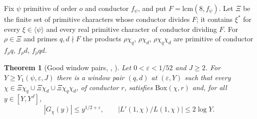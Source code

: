 \documentclass[11pt]{amsart}
\newcommand{\eps}{\varepsilon}
\theoremstyle{plain}
\newtheorem{theorem}{Theorem}[section]
\theoremstyle{definition}
\numberwithin{equation}{section}
\begin{document}
Fix $\psi$ primitive of order $o$ and conductor $f_\psi$, and put $F=\mathrm{lcm}(8,f_\psi)$. Let
$\Xi$ be the finite set of primitive characters whose conductor divides $F$; it contains
$\xi^\ast$ for every $\xi\in\langle\psi\rangle$ and every real primitive character of conductor
dividing $F$. For $\rho\in\Xi$ and primes $q,d\nmid F$ the products $\rho\chi_q$, $\rho\chi_d$,
$\rho\chi_q\chi_d$ are primitive of conductor $f_\rho q$, $f_\rho d$, $f_\rho qd$.

\begin{theorem}[Good window pairs, , ]\label{thm:goodpair}
Let $0<\eps<1/52$ and $J\ge2$. For $Y\ge Y_1(\psi,\eps,J)$ there is a window pair $(q,d)$ at
$(\eps,Y)$ such that every $\chi\in\Xi\chi_q\cup\Xi\chi_d\cup\Xi\chi_q\chi_d$, of conductor $r$,
satisfies $\mathrm{Box}(\chi,r)$ and, for all $y\in[Y,Y^J]$,
\[
|G_\chi(y)|\le y^{1/2+\eps},\qquad |L'(1,\chi)/L(1,\chi)|\le2\log Y.
\]
\end{theorem}
\end{document}
